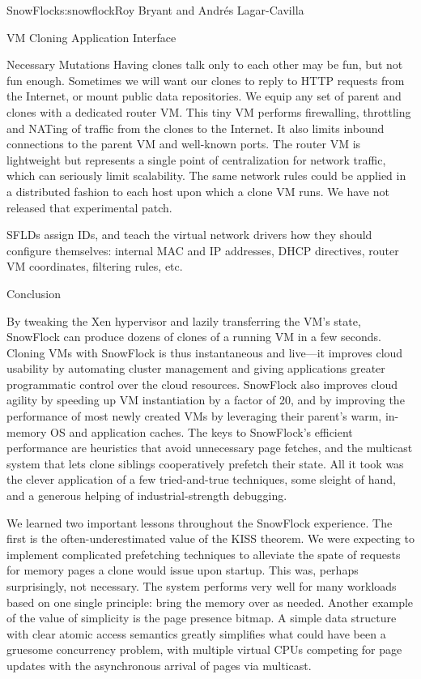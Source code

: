 \begin{aosachapter}{SnowFlock}{s:snowflock}{Roy Bryant and Andr\'e{s} Lagar-Cavilla}
\begin{aosasect1}{VM Cloning Application Interface}
\begin{aosasect2}{Necessary Mutations}
Having clones talk only to each other may be fun, but not fun enough.
Sometimes we will want our clones to reply to HTTP requests from the
Internet, or mount public data repositories. We equip any set of
parent and clones with a dedicated router VM\@. This tiny VM performs
firewalling, throttling and NATing of traffic from the clones to the
Internet. It also limits inbound connections to the parent VM and
well-known ports.  The router VM is lightweight but represents a
single point of centralization for network traffic, which can
seriously limit scalability. The same network rules could be applied
in a distributed fashion to each host upon which a clone VM runs. We
have not released that experimental patch.

SFLDs assign IDs, and teach the virtual network drivers how they
should configure themselves: internal MAC and IP addresses, DHCP
directives, router VM coordinates, filtering rules, etc.

\end{aosasect2}

\end{aosasect1}

\begin{aosasect1}{Conclusion}

By tweaking the Xen hypervisor and lazily transferring the VM's state,
SnowFlock can produce dozens of clones of a running VM in a few
seconds. Cloning VMs with SnowFlock is thus instantaneous and
live---it improves cloud usability by automating cluster management
and giving applications greater programmatic control over the cloud
resources. SnowFlock also improves cloud agility by speeding up VM
instantiation by a factor of 20, and by improving the performance of
most newly created VMs by leveraging their parent's warm, in-memory OS
and application caches. The keys to SnowFlock's efficient performance
are heuristics that avoid unnecessary page fetches, and the multicast
system that lets clone siblings cooperatively prefetch their
state. All it took was the clever application of a few tried-and-true
techniques, some sleight of hand, and a generous helping of
industrial-strength debugging.

We learned two important lessons throughout the SnowFlock experience.
The first is the often-underestimated value of the KISS theorem. We
were expecting to implement complicated prefetching techniques to
alleviate the spate of requests for memory pages a clone would issue
upon startup.  This was, perhaps surprisingly, not necessary. The
system performs very well for many workloads based on one single
principle: bring the memory over as needed.  Another example of the
value of simplicity is the page presence bitmap. A simple data
structure with clear atomic access semantics greatly simplifies what
could have been a gruesome concurrency problem, with multiple virtual
CPUs competing for page updates with the asynchronous arrival of pages
via multicast.


\end{aosasect1}
\end{aosachapter}
